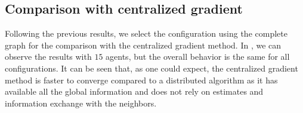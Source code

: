 \documentclass[a4paper,11pt,oneside]{book}
\begin{document}



\subsection{Comparison with centralized gradient}

Following the previous results, we select the configuration using the complete graph for the comparison with the centralized gradient method. In , we can observe the results with $15$ agents, but the overall behavior is the same for all configurations. It can be seen that, as one could expect, the centralized gradient method is faster to converge compared to a distributed algorithm as it has available all the global information and does not rely on estimates and information exchange with the neighbors.
\end{document}
